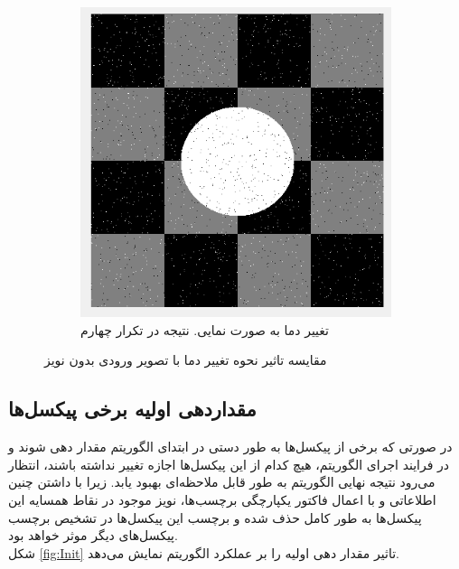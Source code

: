 \documentclass[11.5pt,a4paper]{article}
\begin{document}
\begin{figure}[h]
\begin{subfigure}{0.4\textwidth}
	\includegraphics[scale=0.3]{Imgs/MRF_Iter4_TExp.png}
	\caption{تغییر دما به صورت نمایی. نتیجه در تکرار چهارم}
	\end{subfigure}	
\caption{مقایسه تاثیر نحوه تغییر دما با تصویر ورودی بدون نویز}
\label{fig:T}
\end{figure}


\subsection{مقداردهی اولیه برخی پیکسل‌ها}

در صورتی که برخی از پیکسل‌ها به طور دستی در ابتدای الگوریتم مقدار دهی شوند و در فرایند اجرای الگوریتم،‌ هیچ کدام از این پیکسل‌ها اجازه تغییر نداشته باشند، انتظار می‌رود نتیجه نهایی الگوریتم به طور قابل ملاحظه‌ای بهبود یابد. زیرا با داشتن چنین اطلاعاتی و با اعمال فاکتور یکپارچگی برچسب‌ها، نویز موجود در نقاط همسایه این پیکسل‌ها به طور کامل حذف شده و برچسب این پیکسل‌ها در تشخیص برچسب پیکسل‌های دیگر موثر خواهد بود.
\\
شکل 
\ref{fig:Init}
تاثیر مقدار دهی اولیه را بر عملکرد الگوریتم نمایش می‌دهد.
\end{document}
